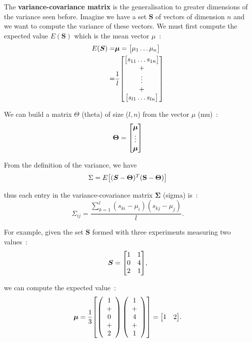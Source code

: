 \documentclass[11pt,twocolumn]{amsart} %
\newcommand{\ve}[1]{\boldsymbol{#1}}
\newcommand{\ma}[1]{\boldsymbol{#1}}
\newenvironment{m}{\begin{bmatrix}}{\end{bmatrix}}
\begin{document}
The \textbf{variance-covariance matrix} is the generalisation to greater dimensions of the variance seen before. Imagine we have a set $\ma{S}$ of vectors of dimension $n$ and we want to compute the variance of these vectors. We must first compute the expected value $E(\ma{S})$ which is the mean vector $\mu$~:
\begin{align*}
  E(\ma{S}) = & \ve{\mu} = \begin{m} \mu_1 \hdots \mu_n \end{m} \\
       = & \frac{1}{l} \begin{m} \begin{m} s_{11} \hdots s_{1n} \end{m} \\ + \\ \vdots \\ + \\ \begin{m} s_{l1} \hdots s_{ln} \end{m} \end{m}
\end{align*}

We can build a matrix $\Theta$ (theta) of size ($l,n$) from the vector $\mu$ (mu)~:
\[
  \ma\Theta = \begin{m} \ve{\mu} \\ \vdots \\ \ve{\mu} \end{m}
\]

From the definition of the variance, we have
\[
  \Sigma = E \begin{m} (\ma{S} - \ma\Theta)^T (\textbf{S} - \ma\Theta)\end{m}
\]

thus each entry in the variance-covariance matrix $\ma\Sigma$ (sigma) is~:
\[
  \Sigma_{ij} = \frac{\sum_{k=1}^{l} (s_{ki} - \mu_i)(s_{kj} - \mu_j)}{l}.
\]


For example, given the set $\ma{S}$ formed with three experiments measuring two values~:
\begin{displaymath}
  \ma{S} = \begin{m} 1 & 1 \\ 0 & 4 \\ 2 & 1 \end{m},
\end{displaymath}

we can compute the expected value~:
\[
  \ve{\mu} = \frac{1}{3} \begin{m} \left( \begin{array}{c} 1 \\ + \\ 0 \\ + \\ 2 \end{array} \right) \left( \begin{array}{c} 1 \\ + \\ 4 \\ + \\ 1 \end{array} \right) \end{m} = \begin{m} 1 & 2 \end{m}.
\]
\end{document}
